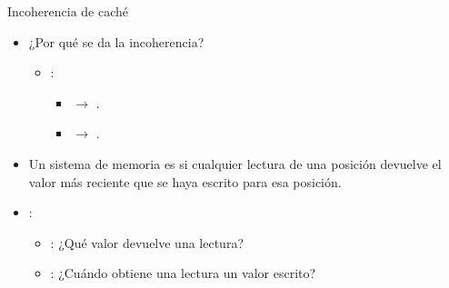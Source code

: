 \begin{frame}[t]{Incoherencia de caché}
\begin{itemize}
  \item ¿Por qué se da la incoherencia?
    \begin{itemize}
      \item {}:
        \begin{itemize}
          \item {} $\rightarrow$ .
          \item {}  $\rightarrow$ .
      \end{itemize}
    \end{itemize}

  \item Un sistema de memoria es  si cualquier lectura de una posición
        devuelve el valor más reciente que se haya escrito para esa posición.

  \item {}:
    \begin{itemize}
      \item {}: ¿Qué valor devuelve una lectura?
      \item {}: ¿Cuándo obtiene una lectura un valor escrito?
    \end{itemize}
\end{itemize}
\end{frame}

